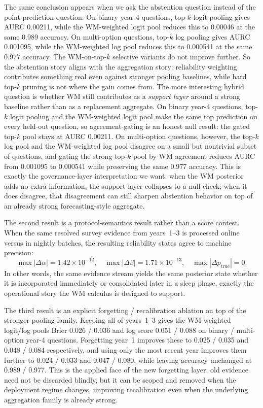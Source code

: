 \documentclass[11pt,openany]{report}
\begin{document}
The same conclusion appears when we ask the abstention question instead
of the point-prediction question.  On binary year-4 questions, top-$k$
logit pooling gives AURC 0.00211, while the WM-weighted logit pool
reduces this to 0.00046 at the same 0.989 accuracy.  On multi-option
questions, top-$k$ log pooling gives AURC 0.001095, while the
WM-weighted log pool reduces this to 0.000541 at the same 0.977
accuracy.  The WM-on-top-$k$ selective variants do not improve further.
So the abstention story aligns with the aggregation story: reliability
weighting contributes something real even against stronger pooling
baselines, while hard top-$k$ pruning is not where the gain comes from.
The more interesting hybrid question is whether WM still contributes as
a \emph{support layer} around a strong baseline rather than as a
replacement aggregate.  On binary year-4 questions, top-$k$ logit
pooling and the WM-weighted logit pool make the same top prediction on
every held-out question, so agreement-gating is an honest null result:
the gated top-$k$ pool stays at AURC 0.00211.  On multi-option
questions, however, the top-$k$ log pool and the WM-weighted log pool
disagree on a small but nontrivial subset of questions, and gating the
strong top-$k$ pool by WM agreement reduces AURC from 0.001095 to
0.000541 while preserving the same 0.977 accuracy.  This is exactly the
governance-layer interpretation we want: when the WM posterior adds no
extra information, the support layer collapses to a null check; when it
does disagree, that disagreement can still sharpen abstention behavior
on top of an already strong forecasting-style aggregate.

The second result is a protocol-semantics result rather than a score
contest.  When the same resolved survey evidence from years~1--3 is
processed online versus in nightly batches, the resulting reliability
states agree to machine precision:
\[
\max |\Delta \alpha| = 1.42 \times 10^{-12}, \quad
\max |\Delta \beta| = 1.71 \times 10^{-13}, \quad
\max |\Delta p_{\mathrm{true}}| = 0.
\]
In other words, the same evidence stream yields the same posterior
state whether it is incorporated immediately or consolidated later in a
sleep phase, exactly the operational story the WM calculus is designed
to support.

The third result is an explicit forgetting / recalibration ablation on
top of the stronger pooling family.  Keeping all of years~1--3 gives the
WM-weighted logit/log pools Brier 0.026 / 0.036 and log score
0.051 / 0.088 on binary / multi-option year-4 questions.  Forgetting
year~1 improves these to 0.025 / 0.035 and 0.048 / 0.084 respectively,
and using only the most recent year improves them further to
0.024 / 0.033 and 0.047 / 0.080, while leaving accuracy unchanged at
0.989 / 0.977.  This is the applied face of the new forgetting layer:
old evidence need not be discarded blindly, but it can be scoped and
removed when the deployment regime changes, improving recalibration even
when the underlying aggregation family is already strong.
\end{document}
